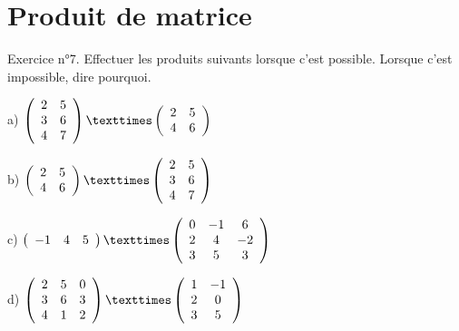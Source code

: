 \newpage
\section{Produit de matrice}
Exercice n°7.
Effectuer les produits suivants lorsque c’est possible. Lorsque c’est impossible, dire pourquoi.

\begin{minipage}[c]{.45\linewidth}
a)
$\left( \begin{array}{ c c }
 2 & 5 \\ 3 & 6 \\ 4 & 7
\end{array} \right)
×
\left( \begin{array}{ c c }
 2 & 5 \\ 4 & 6
\end{array} \right)$
\end{minipage}
\hfill
\begin{minipage}[c]{.45\linewidth}
b)
$\left( \begin{array}{ c c }
 2 & 5 \\ 4 & 6
\end{array} \right)
×
\left( \begin{array}{ c c }
 2 & 5 \\ 3 & 6 \\ 4 & 7
\end{array} \right)$
\end{minipage}

\begin{minipage}[c]{.45\linewidth}
c)
$\left( \begin{array}{ c c c }
 -1 & 4 & 5
\end{array} \right)
×
\left( \begin{array}{ c c c }
 0 & -1 & 6 \\ 2 & 4 & -2 \\ 3 & 5 & 3
\end{array} \right)$
\end{minipage}
\hfill
\begin{minipage}[c]{.45\linewidth}
d)
$\left( \begin{array}{ c c c }
 2 & 5 & 0 \\ 3 & 6 & 3 \\ 4 & 1 & 2
\end{array} \right)
×
\left( \begin{array}{ c c }
 1 & -1 \\ 2 & 0 \\ 3 & 5
\end{array} \right)$
\end{minipage}

